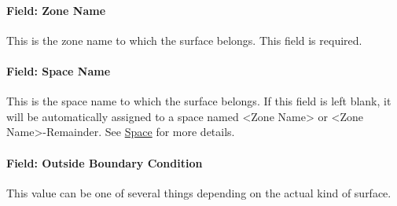 \paragraph{Field: Zone Name}\label{field-zone-name-10-000}

This is the zone name to which the surface belongs. This field is required.

\paragraph{Field: Space Name}\label{field-space-name-10-000}

This is the space name to which the surface belongs. If this field is left blank, it will be automatically assigned to a space named <Zone Name> or <Zone Name>-Remainder. See \hyperref[space]{Space} for more details.

\paragraph{Field: Outside Boundary Condition}\label{field-outside-boundary-condition}

This value can be one of several things depending on the actual kind of surface.

